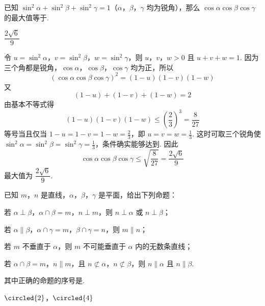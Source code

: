 \begin{problem}
已知 \(\sin^{2}\alpha + \sin^{2}\beta + \sin^{2}\gamma = 1\)（\(\alpha\)，\(\beta\)，\(\gamma\) 均为锐角），那么 \(\cos \alpha \cos \beta \cos \gamma\) 的最大值等于\fillinblank{}.
\end{problem}

\begin{answer}
\(\dfrac{2\sqrt6}{9}\)
\end{answer}

\begin{solution}
令 \(u=\sin^2\alpha\)，\(v=\sin^2\beta\)，\(w=\sin^2\gamma\)，则 \(u\)，\(v\)，\(w>0\) 且 \(u+v+w=1\). 因为三个角都是锐角，\(\cos\alpha\)，\(\cos\beta\)，\(\cos\gamma\) 均为正，所以
\[
(\cos\alpha\cos\beta\cos\gamma)^2=(1-u)(1-v)(1-w)
\]
又
\[
(1-u)+(1-v)+(1-w)=2
\]
由基本不等式得
\[
(1-u)(1-v)(1-w)\leqslant\left(\frac23\right)^3=\frac8{27}
\]
等号当且仅当 \(1-u=1-v=1-w=\frac23\)，即 \(u=v=w=\frac13\). 这时可取三个锐角使 \(\sin^2\alpha=\sin^2\beta=\sin^2\gamma=\frac13\)，条件确实能够达到. 因此
\[
\cos\alpha\cos\beta\cos\gamma\leqslant\sqrt{\frac8{27}}=\frac{2\sqrt6}{9}
\]
最大值为 \(\dfrac{2\sqrt6}{9}\).
\end{solution}

\begin{problem}
已知 \(m\)，\(n\) 是直线，\(\alpha\)，\(\beta\)，\(\gamma\) 是平面，给出下列命题：

\begin{circlelist}
\item 若 \(\alpha \perp \beta\)，\(\alpha \cap \beta = m\)，\(n \perp m\)，则 \(n \perp \alpha\) 或 \(n \perp \beta\)；
\item 若 \(\alpha \parallel \beta\)，\(\alpha \cap \gamma = m\)，\(\beta \cap \gamma = n\)，则 \(m \parallel n\)；
\item 若 \(m\) 不垂直于 \(\alpha\)，则 \(m\) 不可能垂直于 \(\alpha\) 内的无数条直线；
\item 若 \(\alpha \cap \beta = m\)，\(n \parallel m\)，且 \(n \not\subset \alpha\)，\(n \not\subset \beta\)，则 \(n \parallel \alpha\) 且 \(n \parallel \beta\).
\end{circlelist}

其中正确的命题的序号是\fillinblank{}.
\end{problem}

\begin{answer}
\(\circled{2}\)，\(\circled{4}\)
\end{answer}

